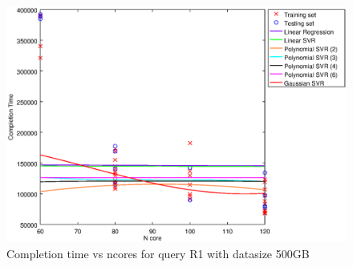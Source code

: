 
\begin {figure}[hbtp]
\centering
\includegraphics[width=\textwidth]{output/R1_500_LINEAR_NCORE/plot_R1_500.eps}
\caption{Completion time vs ncores for query R1 with datasize 500GB}
\label{fig:coreonly_linear_R1_500}
\end {figure}
